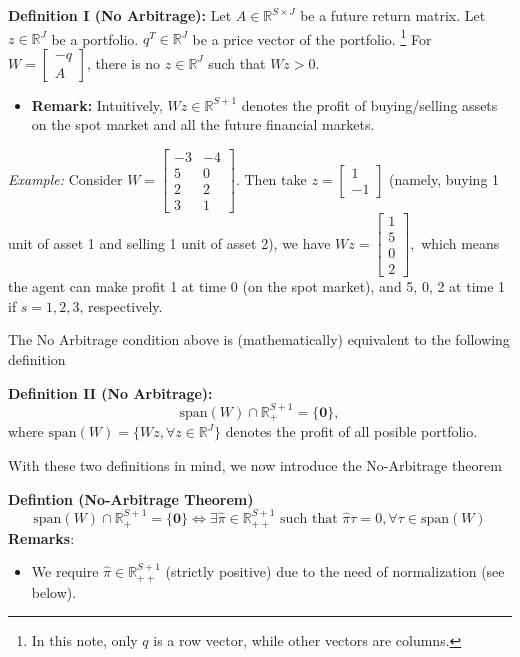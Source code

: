 \begin{tcolorbox}
\textbf{Definition I (No Arbitrage):}
Let $A \in \mathbb{R}^{S \times J}$ be a future return matrix.
Let $z \in \mathbb{R}^{J}$ be a portfolio.
$q^{T} \in \mathbb{R}^{J}$ be a price vector of the portfolio.%
\footnote{
    In this note, only $q$ is a row vector, while other vectors are columns. 
}
For $W = \begin{bmatrix}
  -q \\ A
\end{bmatrix}$,
there is no $z \in \mathbb{R}^{J}$ such that $Wz > 0$.
\\
\begin{itemize}
  \item \textbf{Remark:} Intuitively, $Wz \in \mathbb{R}^{S+1}$ denotes the profit of buying/selling assets on the spot market and all the future financial markets. 
\end{itemize}
\end{tcolorbox}
\noindent \textit{Example:} Consider 
$W = \begin{bmatrix}
-3 & -4  \\ 5 & 0 \\ 2 & 2 \\ 3 & 1
\end{bmatrix}.$
Then take $z = \begin{bmatrix}
1 \\ -1 
\end{bmatrix}$ (namely, buying 1 unit of asset 1 and selling 1 unit of asset 2),
we have 
$Wz = \begin{bmatrix}
1  \\ 5 \\ 0 \\ 2
\end{bmatrix},$
which means the agent can make profit 1 at time 0 (on the spot market), and 
5, 0, 2 at time 1 if $s = 1, 2, 3$, respectively.


The No Arbitrage condition above is (mathematically) equivalent to the following definition
\begin{tcolorbox}
\textbf{Definition II (No Arbitrage):}
\[
\text{span}(W) \cap \mathbb{R}^{S+1}_{+} = \{ \bm{0}\},
\]
where $\text{span}(W) = \{Wz, \forall z \in \mathbb{R}^{J} \}$ denotes the profit of all posible portfolio.
\end{tcolorbox}


With these two definitions in mind, we now introduce the No-Arbitrage theorem
\begin{tcolorbox}
\textbf{Defintion (No-Arbitrage Theorem)}
\[
\text{span}(W) \cap \mathbb{R}^{S+1}_{+} = \{ \bm{0}\} \Leftrightarrow
\exists \hat{\pi} \in \mathbb{R}^{S+1}_{++} \text{ such that } \hat{\pi}  \tau = 0, \forall \tau \in \text{span}(W)
\]
\textbf{Remarks}: 
\begin{itemize}
  \item We require $\hat{\pi} \in \mathbb{R}^{S+1}_{++}$ (strictly positive) due to the need of normalization (see below).
\end{itemize}
\end{tcolorbox}

